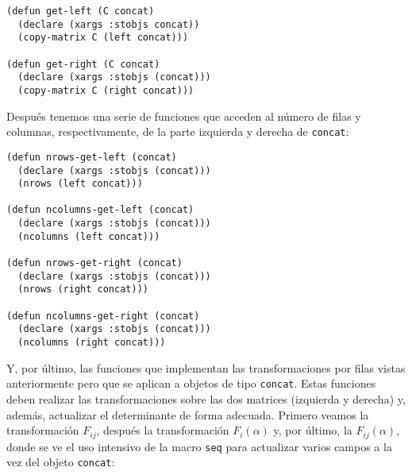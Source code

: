 \documentclass[a4paper,10pt]{article}
\begin{document}
\par \vspace{10pt}

\begin{lstlisting}[language=clips]
(defun get-left (C concat)
  (declare (xargs :stobjs concat))
  (copy-matrix C (left concat)))

(defun get-right (C concat)
  (declare (xargs :stobjs (concat)))
  (copy-matrix C (right concat)))
\end{lstlisting}

\par \vspace{10pt}

Después tenemos una serie de funciones que acceden al número de filas y columnas, respectivamente, de la parte izquierda y derecha de \texttt{concat}:

\par \vspace{10pt}

\begin{lstlisting}[language=clips]
(defun nrows-get-left (concat)
  (declare (xargs :stobjs (concat)))
  (nrows (left concat)))

(defun ncolumns-get-left (concat)
  (declare (xargs :stobjs (concat)))
  (ncolumns (left concat)))

(defun nrows-get-right (concat)
  (declare (xargs :stobjs (concat)))  
  (nrows (right concat)))

(defun ncolumns-get-right (concat)
  (declare (xargs :stobjs (concat)))
  (ncolumns (right concat)))
\end{lstlisting}

\par \vspace{10pt}

Y, por último, las funciones que implementan las transformaciones por filas vistas anteriormente pero que se aplican a objetos de tipo \texttt{concat}. Estas funciones deben realizar las transformaciones sobre las dos matrices (izquierda y derecha) y, además, actualizar el determinante de forma adecuada. Primero veamos la transformación $F_{ij}$, después la transformación $F_{i}(\alpha)$ y, por último, la $F_{ij}(\alpha)$, donde se ve el uso intensivo de la macro \texttt{seq} para actualizar varios campos a la vez del objeto \texttt{concat}:

\par \vspace{10pt}
\end{document}

